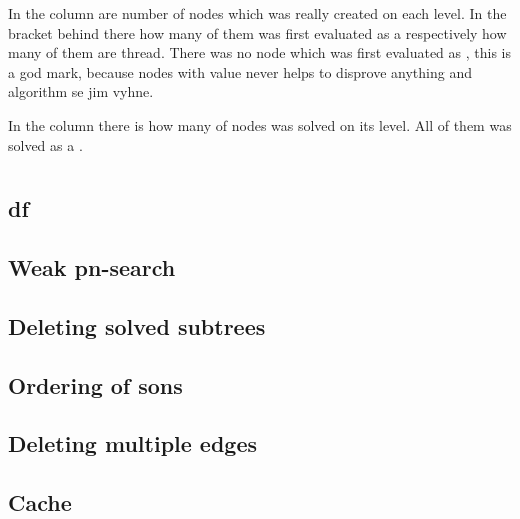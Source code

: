 In the column   are number of nodes which was really created on each level. 
In the bracket behind there how many of them was first evaluated as a \value{false} respectively
how many of them are thread. There was no node which was first evaluated as \value{true},
this is a god mark, because nodes with value \value{true} never helps to disprove anything and
algorithm se jim vyhne.

In the column  there is how many of nodes was solved on its level.
All of them was solved as a \value{false}.

\section{  }


\subsection{df}

\subsection{Weak pn-search}

\subsection{Deleting solved subtrees} 

\subsection{}

\subsection{Ordering of sons} 

\subsection{Deleting multiple edges}

\subsection{Cache}

